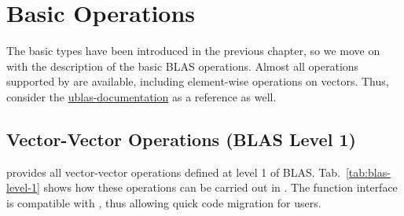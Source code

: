 \chapter{Basic Operations} \label{chap:operations}

The basic types have been introduced in the previous chapter, so we move on with the description of the basic BLAS operations.
Almost all operations supported by {\ublas} are available, including element-wise operations on vectors. Thus, consider the
\href{http://www.boost.org/doc/libs/1_52_0/libs/numeric/ublas/doc/operations_overview.htm}{ublas-documentation} as a reference as well.

\section{Vector-Vector Operations (BLAS Level 1)}

{\ViennaCL} provides all vector-vector operations defined at level 1 of BLAS. Tab.~\ref{tab:blas-level-1} shows how these operations can be carried
out in \ViennaCL. The function interface is compatible with {\ublas},
thus allowing quick code migration for {\ublas} users.




